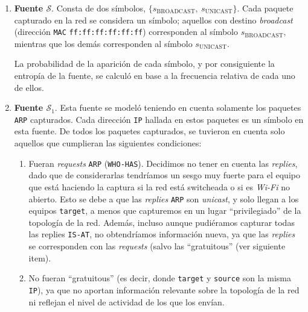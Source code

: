 \begin{enumerate}
    \item \textbf{Fuente $\mathcal{S}$}. Consta de dos símbolos, $\lbrace
    s_{\text{BROADCAST}},\ s_{\text{UNICAST}} \rbrace$. Cada paquete
    capturado en la red se considera un símbolo; aquellos con destino
    \emph{broadcast} (dirección \texttt{MAC} \texttt{ff:ff:ff:ff:ff:ff}) corresponden
    al símbolo $s_{\text{BROADCAST}}$, mientras que los demás corresponden
    al símbolo $s_{\text{UNICAST}}$.

    La probabilidad de la aparición de cada símbolo, y por consiguiente
    la entropía de la fuente, se calculó en base a la frecuencia relativa
    de cada uno de ellos.

    \item \textbf{Fuente $\mathcal{S}_1$}. Esta fuente se modeló teniendo en
    cuenta solamente los paquetes \texttt{ARP} capturados. Cada dirección \texttt{IP}
    hallada en estos paquetes es un símbolo en esta fuente. De
    todos los paquetes capturados, se tuvieron en cuenta solo aquellos que
    cumplieran las siguientes condiciones:
    \begin{enumerate}
        \item Fueran \emph{requests} \texttt{ARP} (\texttt{WHO-HAS}).
        Decidimos no tener en cuenta las \emph{replies}, dado que de
        considerarlas tendríamos un sesgo muy fuerte para el equipo que está
        haciendo la captura si la red está switcheada o si es \emph{Wi-Fi} no abierto.
        Esto se debe a que las \emph{replies} \texttt{ARP} son \emph{unicast},
        y solo llegan a los equipos \texttt{target}, a menos que capturemos en
        un lugar ``privilegiado'' de la topología de la red. Además, incluso
        aunque pudiéramos capturar todas las replies \texttt{IS-AT}, no
        obtendríamos información nueva, ya que las \emph{replies} se
        corresponden con las \emph{requests} (salvo las ``gratuitous'' (ver
        siguiente item).
        \item No fueran ``gratuitous'' (es decir, donde \texttt{target} y
        \texttt{source} son la misma \texttt{IP}), ya que no aportan
        información relevante sobre la topología de la red ni reflejan el
        nivel de actividad de los que los envían.
    \end{enumerate}


\end{enumerate}
